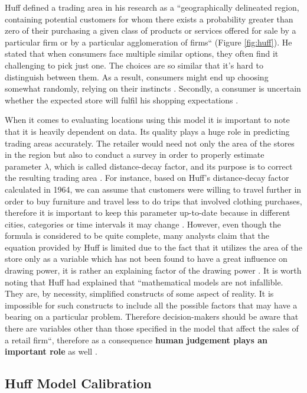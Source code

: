 Huff defined a trading area in his research as a ``geographically delineated region, containing potential customers for whom there exists a probability greater than zero of their purchasing a given class of products or services offered for sale by a particular firm or by a particular agglomeration of firms`` (Figure \ref{fig:huff}). He stated that when consumers face multiple similar options, they often find it challenging to pick just one. The choices are so similar that it's hard to distinguish between them. As a result, consumers might end up choosing somewhat randomly, relying on their instincts \cite{huff1966programmed}. Secondly, a consumer is uncertain whether the expected store will fulfil his shopping expectations \cite{huff1966programmed}. 

When it comes to evaluating locations using this model it is important to note that it is heavily dependent on data. Its quality plays a huge role in predicting trading areas accurately. The retailer would need not only the area of the stores in the region but also to conduct a survey in order to properly estimate parameter $\lambda$, which is called distance-decay factor, and its purpose is to correct the resulting trading area \cite{huff1964defining}. For instance, based on Huff's distance-decay factor calculated in 1964, we can assume that customers were willing to travel further in order to buy furniture and travel less to do trips that involved clothing purchases, therefore it is important to keep this parameter up-to-date because in different cities, categories or time intervals it may change \cite{huff1964defining}. However, even though the formula is considered to be quite complete, many analysts claim that the equation provided by Huff is limited due to the fact that it utilizes the area of the store only as a variable which has not been found to have a great influence on drawing power, it is rather an explaining factor of the drawing power \cite{stanley1976image}. It is worth noting that Huff had explained that ``mathematical models are not infallible. They are, by necessity, simplified constructs of some aspect of reality. It is impossible for such constructs to include all the possible factors that may have a bearing on a particular problem. Therefore decision-makers should be aware that there are variables other than those specified in the model that affect the sales of a retail firm``, therefore as a consequence \textbf{human judgement plays an important role} as well \cite{huff1966programmed}.

\subsection{Huff Model Calibration}
\label{section:huff-model-calibration}

